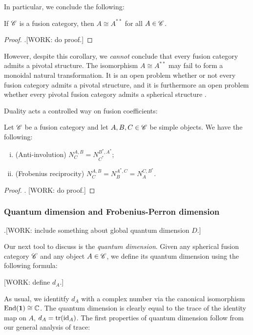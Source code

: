 In particular, we conclude the following:

\begin{corollary} If $\mathscr{C}$ is a fusion category, then $A\cong A^{**}$ for all $A\in \mathscr{C}$.
\end{corollary}
\begin{proof} .[WORK: do proof.]
\end{proof}

However, despite this corollary, we \textit{cannot} conclude that every fusion category admits a pivotal structure. The isomorphism $A\cong A^{**}$ may fail to form a monoidal natural transformation. It is an open problem whether or not every fusion category admits a pivotal structure, and it is furthermore an open problem whether every pivotal fusion category admits a spherical structure \cite{etingof2005fusion}.

Duality acts a controlled way on fusion coefficients:

\begin{proposition}Let $\mathscr{C}$ be a fusion category and let $A,B,C\in \mathscr{C}$ be simple objects. We have the following:

\begin{enumerate}[(i)]
\item (Anti-involution) $N^{A,B}_C=N^{B^*,A^*}_{C^*}$;
\item (Frobenius reciprocity) $N^{A,B}_C = N^{A^*,C}_B = N^{C, B^*}_{A}$.
\end{enumerate}

\end{proposition}
\begin{proof} . [WORK: do proof.]
\end{proof}


\subsubsection{Quantum dimension and Frobenius-Perron dimension}

.[WORK: include something about global quantum dimension $D$.]

Our next tool to discuss is the \textit{quantum dimension}. Given any spherical fusion category $\mathscr{C}$ and any object $A\in \mathscr{C}$, we define its quantum dimension using the following formula:

[WORK: define $d_A$.]

As usual, we identitfy $d_A$ with a complex number via the canonical isomorphism $\operatorname{End}(\mathbf{1})\cong \mathbb{C}$. The quantum dimension is clearly equal to the trace of the identity map on $A$, $d_A=\operatorname{tr}(\operatorname{id}_A)$. The first properties of quantum dimension follow from our general analysis of trace:

